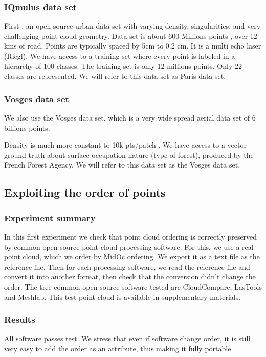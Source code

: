 		
		\subsubsection{IQmulus data set}
			First \cite{IQmulus2014}, an open source urban data set with varying density, singularities, and very challenging point cloud geometry.
			Data set is about 600 Millions points , over 12 kms of road. Points are typically spaced by 5cm to 0.2 cm. It is a multi echo laser (Riegl).
			We have access to a training set where every point is labeled in a hierarchy of 100 classes. The training set is only 12 millions points. Only 22 classes are represented.
			We will refer to this data set as Paris data set.
			
		\subsubsection{Vosges data set}
			We also use the Vosges data set, which is a very wide spread aerial data set of 6 billions points. 
			
			Density is much more constant to 10k pts/patch .
			We have access to a vector ground truth about surface occupation nature (type of forest), produced by the French Forest Agency.
			We will refer to this data set as the Vosges data set.
		
	\subsection{Exploiting the order of points}
		\subsubsection{Experiment summary}
			\label{result.os_softwares}
			In this first experiment we check that point cloud ordering is correctly preserved by common open source point cloud processing software.
			For this, we use a real point cloud, which we order by MidOc ordering. 
			We export it as a text file as the reference file.
			Then for each processing software, we read the reference file and convert it into another format, then check that the conversion didn't change the order. 
			The tree common open source software tested are CloudCompare, LasTools and Meshlab.
			This test point cloud is available in supplementary materials.
		\subsubsection{Results}  
			All software passes test.
			We stress that even if software change order, it is still very easy to add the order as an attribute, thus making it fully portable.
			
